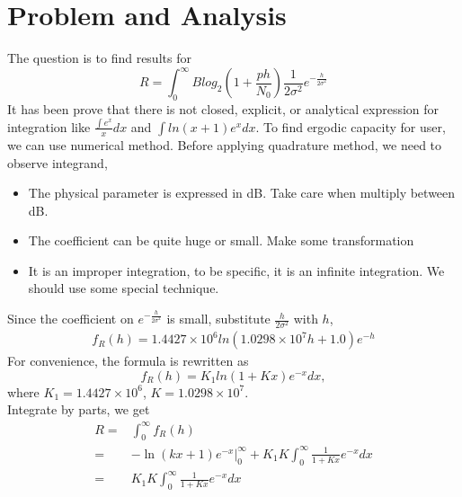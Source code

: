 \documentclass[
10pt, %
a4paper, %
oneside, %
headinclude,footinclude, %
BCOR5mm, %
]{scrartcl}
\theoremstyle{definition}
\begin{document}
{\let\thefootnote\relax{}}



\newpage %


\section{Problem and Analysis}
The question is to find results for \[R=\int _{0}^{\infty} B log_2(1+\frac{ph}{N_0})\frac{1}{2\sigma^2}e^{-\frac{h}{2\sigma^2}}\]
It has been prove that there is not closed,
 explicit, or analytical expression for integration like $\frac{\int e^{x}}{x}dx$ and $\int ln(x+1)e^{x}dx$. To find ergodic capacity for user, we can use numerical method. Before applying quadrature method, we need to observe integrand,
 \begin{itemize}[noitemsep]
  \item The physical parameter is expressed in dB. Take care when multiply  between dB.
  \item The coefficient can be quite huge or small. Make some transformation
  \item It is an improper integration, to be specific, it is an infinite integration. We should use some special technique.
\end{itemize}
Since the coefficient on $e^{-\frac{h}{2\sigma^2}}$ is small, substitute $\frac{h}{2\sigma^2}$ with $h$,
\begin{align*}
  f_R(h)=1.4427\times10^6ln(1.0298\times10^7h + 1.0)e^{-h}
\end{align*}
For convenience, the formula is rewritten as
\begin{equation}
 f_R(h) =   K_1ln(1+Kx)e^{-x}dx,
\end{equation}
where  $K_1 = 1.4427\times10^6$, $K = 1.0298\times10^7$.
\\Integrate by parts, we get
\begin{align}
 R =& \int_{0}^{\infty}f_R(h)\\
  = & \left. { - \ln (kx + 1){e^{ - x}}} \right|_0^\infty + K_1K\int_{0}^{\infty}\frac{1}{1+Kx}e^{-x}dx\\
  = & K_1K\int_{0}^{\infty}\frac{1}{1+Kx}e^{-x}dx
\end{align}
\end{document}
